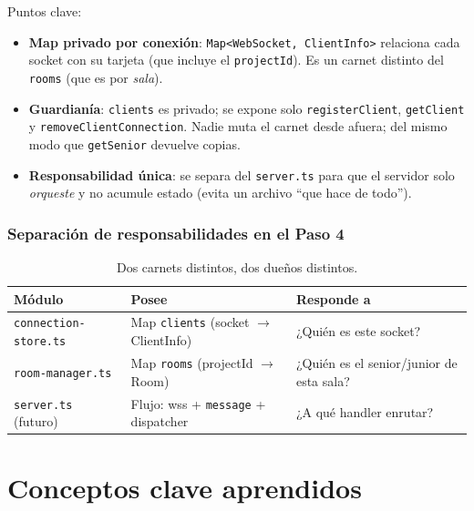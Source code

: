 \documentclass[11pt,a4paper]{article}
\begin{document}
Puntos clave:

\begin{itemize}
  \item \textbf{Map privado por conexión}: \texttt{Map<WebSocket, ClientInfo>}
        relaciona cada socket con su tarjeta (que incluye el \texttt{projectId}).
        Es un carnet distinto del \texttt{rooms} (que es por \emph{sala}).
  \item \textbf{Guardianía}: \texttt{clients} es privado; se expone solo
        \texttt{registerClient}, \texttt{getClient} y
        \texttt{removeClientConnection}. Nadie muta el carnet desde afuera; del
        mismo modo que \texttt{getSenior} devuelve copias.
  \item \textbf{Responsabilidad única}: se separa del \texttt{server.ts} para que
        el servidor solo \emph{orqueste} y no acumule estado (evita un archivo
        ``que hace de todo'').
\end{itemize}

\subsubsection{Separación de responsabilidades en el Paso 4}

\begin{table}[h]
  \centering
  \begin{tabular}{@{}p{4cm}p{5cm}p{4.4cm}@{}}
    \toprule
    \textbf{Módulo} & \textbf{Posee} & \textbf{Responde a} \\
    \midrule
    \texttt{connection-store.ts} & Map \texttt{clients} (socket $\rightarrow$ ClientInfo) & ¿Quién es este socket? \\
    \texttt{room-manager.ts} & Map \texttt{rooms} (projectId $\rightarrow$ Room) & ¿Quién es el senior/junior de esta sala? \\
    \texttt{server.ts} (futuro) & Flujo: wss + \texttt{message} + dispatcher & ¿A qué handler enrutar? \\
    \bottomrule
  \end{tabular}
  \caption{Dos carnets distintos, dos dueños distintos.}
\end{table}

\section{Conceptos clave aprendidos}
\end{document}
